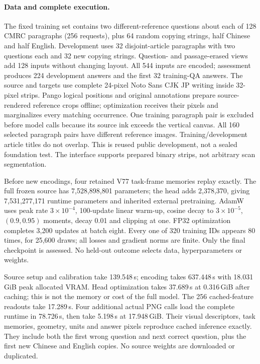 \documentclass[10pt,a4paper]{article}
\begin{document}
\paragraph{Data and complete execution.}
The fixed training set contains two different-reference questions about each
of 128 CMRC paragraphs (256 requests), plus 64 random copying strings, half
Chinese and half English. Development uses 32 disjoint-article paragraphs
with two questions each and 32 new copying strings. Question- and
passage-erased views add 128 inputs without changing layout. All 544 inputs
are encoded; assessment produces 224 development answers and the first
32 training-QA answers. The source and targets use complete 24-pixel Noto Sans
CJK JP writing inside 32-pixel strips. Pango logical positions and original
annotations prepare source-rendered reference crops offline; optimization
receives their pixels and marginalizes every matching occurrence. One
training paragraph pair is excluded before model calls because its source
ink exceeds the vertical canvas. All 160 selected paragraph pairs have
different reference images. Training/development article titles do not
overlap. This is reused public development, not a sealed foundation test.
The interface supports prepared binary strips, not arbitrary scan segmentation.

Before new encodings, four retained V77 task-frame memories replay exactly.
The full frozen source has 7,528,898,801 parameters; the head adds 2,378,370,
giving 7,531,277,171 runtime parameters and inherited external pretraining.
AdamW uses peak rate $3\times10^{-4}$, 100-update linear warm-up, cosine
decay to $3\times10^{-5}$, $(0.9,0.95)$ moments, decay 0.01 and clipping at
one. FP32 optimization completes 3,200 updates at batch eight. Every one of
320 training IDs appears 80 times, for 25,600 draws; all losses and gradient
norms are finite. Only the final checkpoint is assessed. No held-out outcome
selects data, hyperparameters or weights.

Source setup and calibration take 139.548\,s; encoding takes 637.448\,s with
18.031\,GiB peak allocated VRAM. Head optimization takes 37.689\,s at
0.316\,GiB after caching; this is not the memory or cost of the full model.
The 256 cached-feature readouts take 17.289\,s. Four additional actual PNG
calls load the complete runtime in 78.726\,s, then take 5.198\,s at
17.948\,GiB. Their visual descriptors, task memories, geometry, units and
answer pixels reproduce cached inference exactly. They include both the
first wrong question and next correct question, plus the first new Chinese
and English copies. No source weights are downloaded or duplicated.
\end{document}

